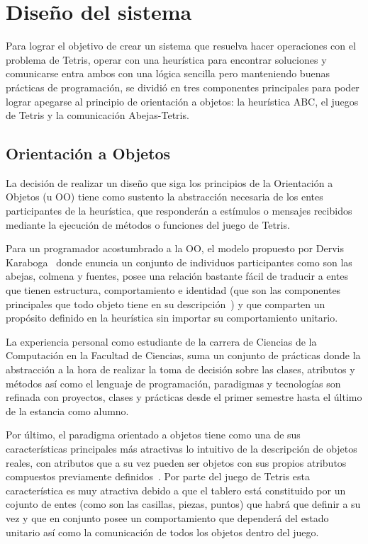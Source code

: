 \section{Diseño del sistema}

Para lograr el objetivo de crear un sistema que resuelva hacer operaciones 
con el problema de Tetris, operar con una heurística para encontrar soluciones y 
comunicarse entra ambos con una lógica sencilla pero manteniendo buenas prácticas de 
programación, se dividió en tres componentes principales para poder 
lograr apegarse al principio de orientación a objetos: 
la heurística ABC, el juegos de Tetris y la comunicación Abejas-Tetris.



\subsection{Orientación a Objetos}

La decisión de realizar un diseño que siga los principios de la Orientación a 
Objetos (u OO) tiene como sustento la abstracción necesaria de los entes participantes 
de la heurística, que responderán a estímulos o mensajes recibidos mediante 
la ejecución de métodos o funciones del juego de Tetris. 

Para un programador acostumbrado a la OO, el modelo propuesto por Dervis 
Karaboga~\cite{karaboga2005idea} donde enuncia un conjunto de individuos 
participantes como son las abejas, colmena y fuentes, posee una relación bastante 
fácil de traducir a entes que tienen estructura, comportamiento e identidad (que son 
las componentes principales que todo objeto tiene en su 
descripción~\cite{gaona2007introduccion}) y que comparten un propósito definido 
en la heurística sin importar su comportamiento unitario. 

La experiencia personal como estudiante de la carrera de Ciencias de la Computación 
en la Facultad de Ciencias, suma un conjunto de prácticas donde la abstracción 
a la hora de realizar la toma de decisión sobre las clases, atributos y métodos 
así como el lenguaje de programación, paradigmas y tecnologías son refinada con 
proyectos, clases y prácticas desde el primer semestre hasta el último de la 
estancia como alumno. 

Por último, el paradigma orientado a objetos tiene como una de sus 
características principales más atractivas lo intuitivo de la descripción 
de objetos reales, con atributos que a su vez pueden ser objetos con sus 
propios atributos compuestos previamente definidos~\cite{Lewis:2007:JSS:1554921}.  
Por parte del juego de Tetris esta característica es muy atractiva debido a que 
el tablero está constituido por un cojunto de entes (como son las casillas, piezas, 
puntos) que habrá que definir a su vez y que en conjunto posee un 
comportamiento que dependerá del estado unitario así como la comunicación de 
todos los objetos dentro del juego. 

